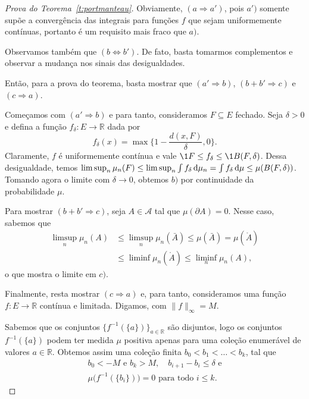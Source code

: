 \begin{topics}
  \begin{proof}[Prova do Teorema~\ref{t:portmanteau}]
    Obviamente, $(a \Rightarrow a')$, pois $a')$ somente supõe a convergência das integrais para funções $f$ que sejam uniformemente contínuas, portanto é um requisito mais fraco que $a)$.

    Observamos também que $(b \Leftrightarrow b')$.
    De fato, basta tomarmos complementos e observar a mudança nos sinais das desigualdades.

    Então, para a prova do teorema, basta mostrar que $(a' \Rightarrow b)$, $(b + b' \Rightarrow c)$ e $(c \Rightarrow a)$.

    Começamos com $(a' \Rightarrow b)$ e para tanto, consideramos $F \subseteq E$ fechado.
    Seja $\delta > 0$ e defina a função $f_\delta: E \to \mathbb{R}$ dada por
    \begin{equation}
      f_\delta (x) = \max \Big\{ 1 - \frac{d(x, F)}{\delta}, 0 \Big\}.
    \end{equation}
    Claramente, $f$ é uniformemente contínua e vale $\1{F} \leq f_\delta \leq \1{B(F,\delta)}$.
    Dessa desigualdade, temos $\limsup_n \mu_n(F) \leq \limsup_n \int f_\delta \mathop{}\!\mathrm{d} \mu_n = \int f_\delta \mathop{}\!\mathrm{d} \mu \leq \mu(B(F,\delta))$.
    Tomando agora o limite com $\delta \to 0$, obtemos $b)$ por continuidade da probabilidade $\mu$.

    Para mostrar $(b + b' \Rightarrow c)$, seja $A \in \mathcal{A}$ tal que $\mu(\partial A) = 0$.
    Nesse caso, sabemos que
    \begin{equation*}
      \begin{split}
        \limsup_n \mu_n(A) & \leq \limsup_n \mu_n(\bar A) \leq \mu (\bar A) = \mu (\mathring{A})\\
        & \leq \liminf \mu_n (\mathring{A}) \leq \liminf_n \mu_n (A),
      \end{split}
    \end{equation*}
    o que mostra o limite em $c)$.

    Finalmente, resta mostrar $(c \Rightarrow a)$ e, para tanto, consideramos uma função $f: E \to \mathbb{R}$ contínua e limitada.
    Digamos, com $\lVert f \rVert_\infty = M$.

    Sabemos que os conjuntos $\{f^{-1}(\{a\})\}_{a \in \mathbb{R}}$ são disjuntos, logo os conjuntos $f^{-1}(\{a\})$ podem ter medida $\mu$ positiva apenas para uma coleção enumerável de valores $a \in \mathbb{R}$.
    Obtemos assim uma coleção finita $b_0 < b_1 < \dots < b_k$, tal que
    \begin{equation}
      \begin{array}{c}
        b_0 < -M \text{ e } b_k > M, \quad b_{i+1} - b_i \leq \delta \text{ e}\\
        \mu\big(f^{-1} (\{b_i\}) \big) = 0 \text{ para todo $i \leq k$}.
      \end{array}
    \end{equation}


\end{proof}
\end{topics}
